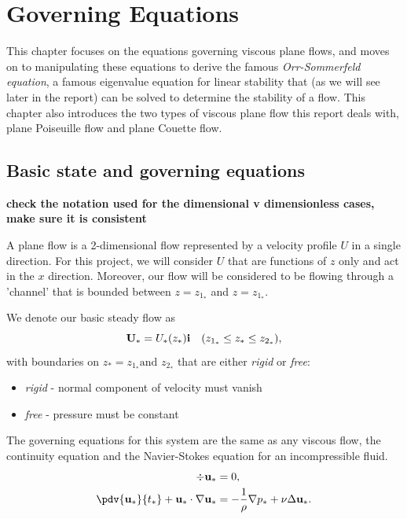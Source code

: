 \chapter{Governing Equations}
\label{chap:governing}

This chapter focuses on the equations governing viscous plane flows, and moves on to manipulating these equations to derive the famous \emph{Orr-Sommerfeld equation}, a famous eigenvalue equation for linear stability that (as we will see later in the report) can be solved to determine the stability of a flow. This chapter also introduces the two types of viscous plane flow this report deals with, plane Poiseuille flow and plane Couette flow. 

\section{Basic state and governing equations}
\textbf{check the notation used for the dimensional v dimensionless cases, make sure it is consistent}

A plane flow is a 2-dimensional flow represented by a velocity profile $ U $ in a single direction. For this project, we will consider $ U $ that are functions of $ z $ only and act in the $ x $ direction. Moreover, our flow will be considered to be flowing through a 'channel' that is bounded between $ z = z_{1_*} $ and $ z = z_{1_*} $.

We denote our basic steady flow as
\begin{equation}
    \mathbf{U}_* = U_* (z_*) \mathbf{i} \hspace{10px} (z_{1_*} \leq z_* \leq z_{2_*}),
\end{equation}
with boundaries on $z_* = z_{1_*} \text{and } z_{2_*}$ that are either \emph{rigid} or \emph{free}:
\begin{itemize}
    \item \emph{rigid} - normal component of velocity must vanish
    \item \emph{free} - pressure must be constant
\end{itemize}

The governing equations for this system are the same as any viscous flow, the continuity equation and the Navier-Stokes equation for an incompressible fluid. 
\begin{align}
    \div{\mathbf{u_*}} &= 0, \nonumber\\
    \pdv{\mathbf{u_*}}{t_*} + \mathbf{u_*} \cdot \nabla \mathbf{u_*} &= - \frac{1}{\rho} \nabla p_* + \nu \Delta \mathbf{u_*}.
\label{dimgoveq}
\end{align}

